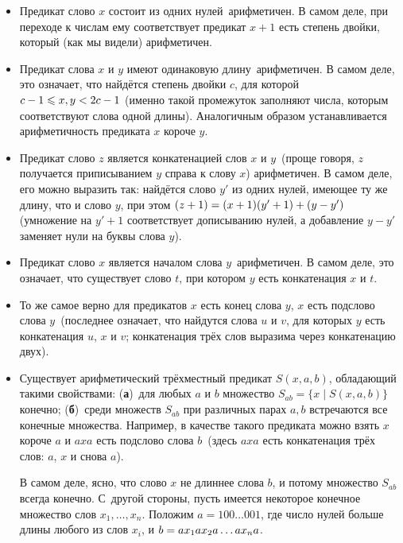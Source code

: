 \begin{itemize}
      \item
Предикат  слово $x$ состоит из одних нулей\ арифметичен. В
самом деле, при переходе к числам ему соответствует предикат
$x+1$ есть степень двойки, который (как мы видели)
арифметичен.
        \item
Предикат  слова $x$ и $y$ имеют одинаковую длину\
арифметичен. В самом деле, это означает, что найдётся степень
двойки $c$, для которой $c-1\hm\le x,y\hm<2c-1$ (именно такой
промежуток заполняют числа, которым соответствуют слова одной
длины). Аналогичным образом устанавливается арифметичность
предиката  $x$ короче $y$.
        \item
Предикат  слово $z$ является конкатенацией слов $x$ и $y$\
(проще говоря, $z$ получается приписыванием $y$ справа к слову $x$)
арифметичен. В самом деле, его можно выразить так: найдётся
слово $y'$ из одних нулей, имеющее ту же длину, что и слово $y$,
при этом $(z+1)\hm=(x+1)(y'+1)+(y-y')$ (умножение на $y'+1$
соответствует дописыванию нулей, а добавление $y-y'$ заменяет
нули на буквы слова $y$).
        \item
Предикат  слово $x$ является началом слова $y$\
арифметичен. В самом деле, это означает, что существует слово
$t$, при котором $y$ есть конкатенация $x$ и $t$.
        \item
То же самое верно для предикатов \лк $x$ есть конец слова $y$,
\лк $x$ есть подслово слова $y$\пк\ (последнее означает, что
найдутся слова $u$ и $v$, для которых $y$ есть конкатенация
$u$, $x$ и $v$; конкатенация трёх слов выразима через
конкатенацию двух).
        \item
Существует арифметический трёхместный предикат $S(x,a,b)$, обладающий
такими свойствами: (\textbf{а})~для любых $a$ и $b$ множество
$S_{ab}=\{x\mid S(x,a,b)\}$%
\index{$S_{ab}$|defin}
конечно; (\textbf{б})~среди множеств
$S_{ab}$ при различных парах $a,b$ встречаются все конечные
множества. Например, в качестве такого предиката можно взять 
$x$ короче $a$ и
$axa$ есть подслово слова $b$\пк\ (здесь $axa$ есть конкатенация
трёх слов: $a$, $x$ и снова $a$).

В самом деле, ясно, что слово $x$ не длиннее слова $b$, и потому
множество $S_{ab}$ всегда конечно. С~другой стороны, пусть
имеется некоторое конечное множество слов $x_1,\dots, x_n$.
Положим $a=100\dots001$, где число нулей больше длины любого из
слов $x_i$, и $b\hm=ax_1ax_2a\dots ax_na$.
\end{itemize}

